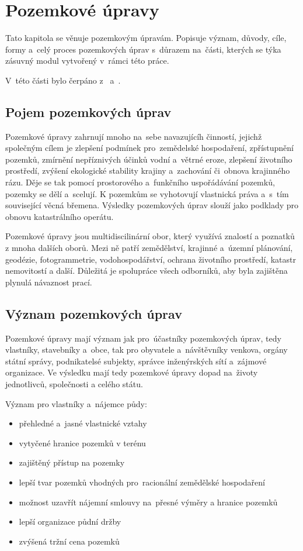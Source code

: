 \chapter{Pozemkové úpravy}
\label{2-pu}

Tato kapitola se věnuje pozemkovým úpravám. Popisuje význam, důvody, cíle, formy a~celý proces pozemkových úprav s~důrazem na~části, kterých se týka zásuvný modul vytvořený v~rámci této práce.

V~této části bylo čerpáno z~\citep{pu_zakon} \citep{pu_cr} \citep{metodicky_navrh} a~\citep{pu_skripta}.

\section{Pojem pozemkových úprav}
\label{pojem_pu}

Pozemkové úpravy zahrnují mnoho na~sebe navazujícíh činností, jejichž společným cílem je zlepšení podmínek pro~zemědelské hospodaření, zpřístupnění pozemků, zmírnění nepříznivých účinků vodní a~větrné eroze, zlepšení životního prostředí, zvýšení ekologické stability krajiny a~zachování či~obnova krajinného rázu. Děje se tak pomocí prostorového a~funkčního uspořádávání pozemků, pozemky se dělí a~scelují. K pozemkům se vyhotovují vlastnická práva a~s~tím související věcná břemena. Výsledky pozemkových úprav slouží jako podklady pro obnovu katastrálního operátu.

Pozemkové úpravy jsou multidiscilinární obor, který využívá znalostí a poznatků z mnoha dalších oborů. Mezi ně patří zemědělství, krajinné a~územní plánování, geodézie, fotogrammetrie, vodohospodářství, ochrana životního prostředí, katastr nemovitostí a další. Důležitá je spolupráce všech odborníků, aby byla zajištěna plynulá návaznost prací.

\section{Význam pozemkových úprav}
\label{vyznam_pu}

Pozemkové úpravy mají význam jak pro~účastníky pozemkových úprav, tedy vlastníky, stavebníky a~obce, tak pro obyvatele a~návštěvníky venkova, orgány státní správy, podnikatelsé subjekty, správce inženýrských sítí a~zájmové organizace. Ve výsledku mají tedy pozemkové úpravy dopad na~životy jednotlivců, společnosti a celého státu.

Význam  pro vlastníky a~nájemce půdy:
	\begin{itemize}[noitemsep, leftmargin=1.5cm]
		\item přehledné a~jasné vlastnické vztahy
		\item vytyčené hranice pozemků v terénu
		\item zajištěný přístup na pozemky
		\item lepší tvar pozemků vhodných pro~racionální zemědělské hospodaření
		\item možnost uzavřít nájemní smlouvy na~přesné výměry a hranice pozemků
		\item lepší organizace půdní držby
		\item zvýšená tržní cena pozemků
	\end{itemize}

